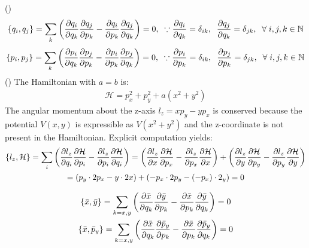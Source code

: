 \documentclass{report}
\theoremstyle{definition}
\newcounter{subpart1}[chapter1]
\begin{document}
\begin{chapter2}\label{prob: 10}
		()
		\begin{gather*}
			\acomm{q_i}{q_j} = \sum_k \pqty{\pdv{q_i}{q_k}\pdv{q_j}{p_k} - \pdv{q_i}{p_k}\pdv{q_j}{q_k}} = 0, \;\; \because \pdv{q_i}{q_k} = \delta_{ik}, \;\; \pdv{q_j}{q_k} = \delta_{jk}, \;\; \forall \; i, j, k \in \mathbb{N}
		\end{gather*}
		\begin{gather*}
			\acomm{p_i}{p_j} = \sum_k \pqty{\pdv{p_i}{q_k}\pdv{p_j}{p_k} - \pdv{p_i}{p_k}\pdv{p_j}{q_k}} = 0, \;\; \because \pdv{p_i}{p_k} = \delta_{ik}, \;\; \pdv{p_j}{p_k} = \delta_{jk}, \;\;\forall \; i, j, k \in \mathbb{N}
		\end{gather*}
		()
		The Hamiltonian with $a = b$ is:
		\begin{gather*}
			\mathcal{H} = p^2_x + p^2_y + a(x^2 + y ^2)
		\end{gather*}
		The angular momentum about the z-axis $l_z = xp_y - yp_x$ is conserved because the potential $V(x,y)$ is expressible as $V(x^2 + y^2)$ and the z-coordinate is not present in the Hamiltonian. Explicit computation yields:
		\begin{gather*}
			\acomm{l_z}{\mathcal{H}} = \sum_i \pqty{\pdv{l_z}{q_i}\pdv{\mathcal{H}}{p_i} - \pdv{l_z}{p_i}\pdv{\mathcal{H}}{q_i}} = \pqty{\pdv{l_z}{x} \pdv{\mathcal{H}}{p_x} - \pdv{l_z}{p_x} \pdv{\mathcal{H}}{x}} + \pqty{\pdv{l_z}{y}\pdv{\mathcal{H}}{p_y} - \pdv{l_z}{p_y}\pdv{\mathcal{H}}{y}} \\
			= (p_y \cdot 2p_x - y\cdot 2x) + (-p_x \cdot 2p_y -(-p_x)\cdot 2_y) = 0
		\end{gather*}
\end{chapter2}

\begin{chapter2}\label{prob: 11}
	
\end{chapter2}

\begin{chapter2}\label{prob: 12}
	\begin{gather*}
			\acomm{\bar x}{\bar y} = \sum_{k = x, y} \pqty{\pdv{\bar x}{q_k}\pdv{\bar y}{p_k} - \pdv{\bar x}{p_k}\pdv{\bar y}{q_k}} = 0 \\
			\acomm{\bar x}{\bar p_y} = \sum_{k = x, y} \pqty{\pdv{\bar x}{q_k}\pdv{\bar p_y}{p_k} - \pdv{\bar x}{p_k}\pdv{\bar p_y}{q_k}} = 0
		\end{gather*}
\end{chapter2}
\end{document}
